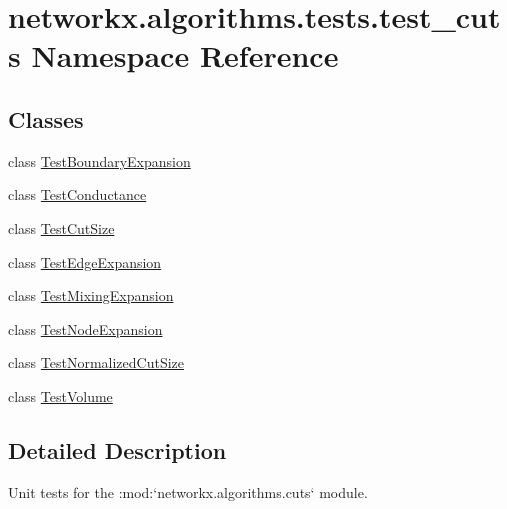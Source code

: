 \hypertarget{namespacenetworkx_1_1algorithms_1_1tests_1_1test__cuts}{}\section{networkx.\+algorithms.\+tests.\+test\+\_\+cuts Namespace Reference}
\label{namespacenetworkx_1_1algorithms_1_1tests_1_1test__cuts}
\subsection*{Classes}
\begin{DoxyCompactItemize}
\item 
class \hyperlink{classnetworkx_1_1algorithms_1_1tests_1_1test__cuts_1_1TestBoundaryExpansion}{Test\+Boundary\+Expansion}
\item 
class \hyperlink{classnetworkx_1_1algorithms_1_1tests_1_1test__cuts_1_1TestConductance}{Test\+Conductance}
\item 
class \hyperlink{classnetworkx_1_1algorithms_1_1tests_1_1test__cuts_1_1TestCutSize}{Test\+Cut\+Size}
\item 
class \hyperlink{classnetworkx_1_1algorithms_1_1tests_1_1test__cuts_1_1TestEdgeExpansion}{Test\+Edge\+Expansion}
\item 
class \hyperlink{classnetworkx_1_1algorithms_1_1tests_1_1test__cuts_1_1TestMixingExpansion}{Test\+Mixing\+Expansion}
\item 
class \hyperlink{classnetworkx_1_1algorithms_1_1tests_1_1test__cuts_1_1TestNodeExpansion}{Test\+Node\+Expansion}
\item 
class \hyperlink{classnetworkx_1_1algorithms_1_1tests_1_1test__cuts_1_1TestNormalizedCutSize}{Test\+Normalized\+Cut\+Size}
\item 
class \hyperlink{classnetworkx_1_1algorithms_1_1tests_1_1test__cuts_1_1TestVolume}{Test\+Volume}
\end{DoxyCompactItemize}


\subsection{Detailed Description}
\begin{DoxyVerb}Unit tests for the :mod:`networkx.algorithms.cuts` module.\end{DoxyVerb}
 